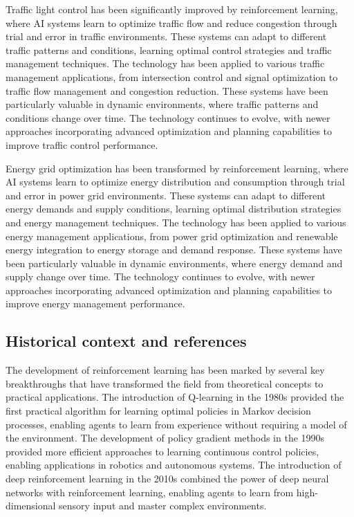 Traffic light control has been significantly improved by reinforcement learning, where AI systems learn to optimize traffic flow and reduce congestion through trial and error in traffic environments. These systems can adapt to different traffic patterns and conditions, learning optimal control strategies and traffic management techniques. The technology has been applied to various traffic management applications, from intersection control and signal optimization to traffic flow management and congestion reduction. These systems have been particularly valuable in dynamic environments, where traffic patterns and conditions change over time. The technology continues to evolve, with newer approaches incorporating advanced optimization and planning capabilities to improve traffic control performance.

Energy grid optimization has been transformed by reinforcement learning, where AI systems learn to optimize energy distribution and consumption through trial and error in power grid environments. These systems can adapt to different energy demands and supply conditions, learning optimal distribution strategies and energy management techniques. The technology has been applied to various energy management applications, from power grid optimization and renewable energy integration to energy storage and demand response. These systems have been particularly valuable in dynamic environments, where energy demand and supply change over time. The technology continues to evolve, with newer approaches incorporating advanced optimization and planning capabilities to improve energy management performance.

\subsection{Historical context and references}

The development of reinforcement learning has been marked by several key breakthroughs that have transformed the field from theoretical concepts to practical applications. The introduction of Q-learning in the 1980s provided the first practical algorithm for learning optimal policies in Markov decision processes, enabling agents to learn from experience without requiring a model of the environment. The development of policy gradient methods in the 1990s provided more efficient approaches to learning continuous control policies, enabling applications in robotics and autonomous systems. The introduction of deep reinforcement learning in the 2010s combined the power of deep neural networks with reinforcement learning, enabling agents to learn from high-dimensional sensory input and master complex environments.


